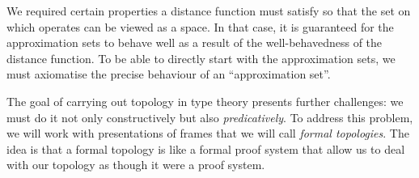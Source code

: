 We required certain properties a distance function must satisfy so that the set on which
operates can be viewed as a space. In that case, it is guaranteed for the approximation
sets to behave well as a result of the well-behavedness of the distance function. To be
able to directly start with the approximation sets, we must axiomatise the precise
behaviour of an ``approximation set''.



The goal of carrying out topology in type theory presents further challenges: we must do
it not only constructively but also \emph{predicatively}. To address this problem, we will
work with presentations of frames that we will call \emph{formal topologies}. The idea is
that a formal topology is like a formal proof system that allow us to deal with our
topology as though it were a proof system.
